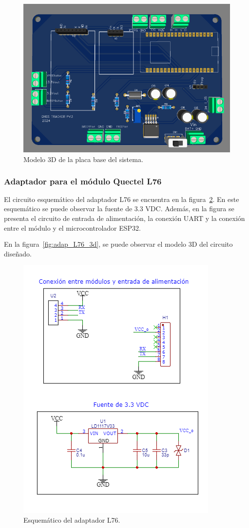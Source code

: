 \begin{figure}[htbp]
	\centering
	\includegraphics[width=.5\textwidth]{./Figures/PCB_TFE_Modelo_3D.png}
	\caption{Modelo 3D de la placa base del sistema.}
	\label{fig:placa_base_3d}
\end{figure}


\subsubsection{Adaptador para el módulo Quectel L76}

El circuito esquemático del adaptador L76 se encuentra en la figura~\ref{fig:adap_L76}. En este esquemático se puede observar la fuente de 3.3 VDC. Además, en la figura se presenta el circuito de entrada de alimentación, la conexión UART y la conexión entre el módulo y el microcontrolador ESP32.  

En la figura~\ref{fig:adap_L76_3d}, se puede observar el modelo 3D del circuito diseñado. 

\begin{figure}[htbp]
	\centering
	\includegraphics[width=.5\textwidth]{./Figures/QL76_Esquematico.png}
	\caption{Esquemático del adaptador L76.}
	\label{fig:adap_L76}
\end{figure}

